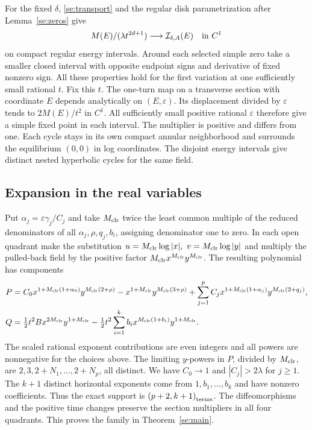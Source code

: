 For the fixed \(\delta\), \eqref{se:transport} and the regular disk
parametrization after Lemma~\ref{se:zeros} give
\[
        M(E)/(\lambda t^{2d+1})\longrightarrow{\cal I}_{\delta,A}(E)
              \quad\text{in }C^1
\]
on compact regular energy intervals. Around each selected simple zero
take a smaller closed interval with opposite endpoint signs and derivative
of fixed nonzero sign. All these properties hold for the first variation
at one sufficiently small rational \(t\). Fix this \(t\). The one-turn
map on a transverse section with coordinate \(E\) depends analytically
on \((E,\varepsilon)\). Its displacement divided by \(\varepsilon\)
tends to \(2M(E)/t^2\) in \(C^1\). All sufficiently small positive
rational \(\varepsilon\) therefore give a simple fixed point in each
interval. The multiplier is positive and differs from one. Each cycle
stays in its own compact annular neighborhood and surrounds the
equilibrium \((0,0)\) in log coordinates. The disjoint energy intervals
give distinct nested hyperbolic cycles for the same field.

\subsection{Expansion in the real variables}
Put \(\alpha_j=\varepsilon\gamma_j/C_j\) and take \(M_{\mathrm{clr}}{}\) twice the
least common multiple of the reduced denominators of all
\(\alpha_j,\rho,q_j,b_i\), assigning denominator one to zero.
In each open quadrant make the substitution
\(u=\Mclr{}\log|x|,\ v=\Mclr{}\log|y|\) and multiply the pulled-back field by the
positive factor \(M_{\mathrm{clr}}{} x^{M_{\mathrm{clr}}} y^{M_{\mathrm{clr}}}\). The resulting polynomial has components
\begin{align}
 P={}&C_0 x^{1+M_{\mathrm{clr}}{}(1+\alpha_0)}y^{M_{\mathrm{clr}}{}(2+\rho)}
       -x^{1+M_{\mathrm{clr}}{}}y^{M_{\mathrm{clr}}{}(3+\rho)}
        +\sum_{j=1}^p C_j x^{1+M_{\mathrm{clr}}{}(1+\alpha_j)}y^{M_{\mathrm{clr}}{}(2+q_j)},\notag\\
 Q={}&\tfrac12t^2 B x^{2M_{\mathrm{clr}}{}}y^{1+M_{\mathrm{clr}}{}}
       -\tfrac12t^2\sum_{i=1}^k b_i x^{M_{\mathrm{clr}}{}(1+b_i)}y^{1+M_{\mathrm{clr}}{}}.            \label{se:poly}
\end{align}
The scaled rational exponent contributions are even integers and all
powers are nonnegative for the choices above. The limiting \(y\)-powers
in \(P\), divided by \(M_{\mathrm{clr}}{}\), are \(2,3,2+N_1,\ldots,2+N_p\), all
distinct. We have \(C_0\to1\) and \(|C_j|>2\lambda\) for \(j\ge1\).
The \(k+1\) distinct horizontal exponents come from \(1,b_1,\ldots,b_k\)
and have nonzero coefficients. Thus the exact support is \(\left(p+2,k+1\right)_{\mathrm{terms}}\).
The diffeomorphisms and the positive time changes preserve the section
multipliers in all four quadrants. This proves the family in
Theorem~\ref{se:main}.
